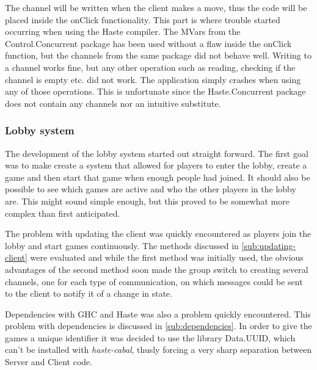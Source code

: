 \documentclass[a4paper]{article}
\begin{document}
The channel will be written when the client makes a move, thus the code will be placed inside the onClick functionality. This part is where trouble started occurring when using the Haste compiler. The MVars from the Control.Concurrent package has been used without a flaw inside the onClick function, but the channels from the same package did not behave well. Writing to a channel works fine, but any other operation such as reading, checking if the channel is empty etc. did not work. The application simply crashes when using any of those operations. This is unfortunate since the Haste.Concurrent package does not contain any channels nor an intuitive substitute. 




\subsubsection{Lobby system}
The development of the lobby system started out straight forward. The first goal was to make create a system that allowed for players to enter the lobby, create a game and then start that game when enough people had joined. It should also be possible to see which games are active and who the other players in the lobby are. This might sound simple enough, but this proved to be somewhat more complex than first anticipated. 

The problem with updating the client was quickly encountered as players join the lobby and start games continuously. The methods discussed in \cref{sub:updating-client} were evaluated and while the first method was initially used, the obvious advantages of the second method soon made the group switch to creating several channels, one for each type of communication, on which messages could be sent to the client to notify it of a change in state.

Dependencies with GHC and Haste was also a problem quickly encountered. This problem with dependencies is discussed in \cref{sub:dependencies}. In order to give the games a unique identifier it was decided to use the library Data.UUID, which can't be installed with \textit{haste-cabal}, thusly forcing a very sharp separation between Server and Client code. 



\end{document}
